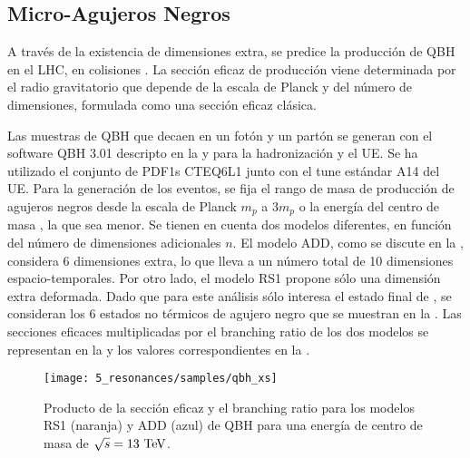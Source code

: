 \subsection{Micro-Agujeros Negros}
\label{subsec:samples:samples:sig:qbh}


A través de la existencia de dimensiones extra, se predice la producción de \acf{QBH} en el \ac{LHC}, en colisiones \pp.
La sección eficaz de producción viene determinada por el radio gravitatorio que depende de la escala de Planck y del número de dimensiones, formulada como una sección eficaz clásica.


Las muestras de \ac{QBH} que decaen en un fotón y un partón se generan con el software \ac{QBH} 3.01 descripto en la  y  para la hadronización y el \ac{UE}. Se ha utilizado el conjunto de \acp{PDF1} CTEQ6L1 junto con el tune estándar A14 del \ac{UE}. Para la generación de los eventos, se fija el rango de masa de producción de agujeros negros desde la escala de Planck \(m_p\) a \(3 m_p\) o la energía del centro de masa \sqs, la que sea menor. Se tienen en cuenta dos modelos diferentes, en función del número de dimensiones adicionales \(n\). El modelo ADD, como se discute en la \Sect{\ref{subsec:theory:bsm:qbh}}, considera 6 dimensiones extra, lo que lleva a un número total de 10 dimensiones espacio-temporales. Por otro lado, el modelo RS1 propone sólo una dimensión extra deformada. Dado que para este análisis sólo interesa el estado final de \gammajet, se consideran los 6 estados no térmicos de agujero negro que se muestran en la \Sect{\ref{subsec:theory:bsm:qbh}}. Las secciones eficaces multiplicadas por el branching ratio de los dos modelos se representan en la \Fig{\ref{fig:samples:samples:sig:qbh:xs}} y los valores correspondientes en la \Tab{\ref{tab:samples:samples:sig:qbh:xs}}.


\begin{figure}[ht!]
    \centering
    \texttt{[image: 5\_resonances/samples/qbh\_xs]}
    \caption{Producto de la sección eficaz y el branching ratio para los modelos RS1 (naranja) y ADD (azul) de \ac{QBH} para una energía de centro de masa de \(\sqrt{s}=13~\text{TeV}\).}
    \label{fig:samples:samples:sig:qbh:xs}
\end{figure}


